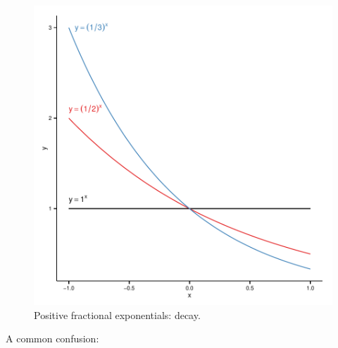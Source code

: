\begin{knitrout}
\color{fgcolor}\begin{figure}[]

\includegraphics[width=\linewidth]{images/math-fun_expdecay} \caption{Positive fractional exponentials: decay.\label{fig:fun_expdecay}}
\end{figure}


\end{knitrout}


A common confusion:

